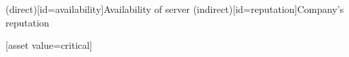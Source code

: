 \documentclass{article}
\begin{document}
\begin{corasassetdiagram}[x=1cm,y=1cm,asset columns=2]
  \asset(direct)[id=availability]{Availability of server}
  \asset(indirect)[id=reputation]{Company's reputation}

  [asset value=critical]
\end{corasassetdiagram}
\end{document}
